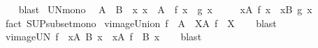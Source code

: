 \begin{isabellebody}
%
\isadelimproof
\ \ %
\endisadelimproof
%
\isatagproof
{}\isamarkupfalse%
\ blast%
\endisatagproof
{\isafoldproof}%
%
\isadelimproof
\isanewline
%
\endisadelimproof
\isanewline
{}\isamarkupfalse%
\ UN{\isacharunderscore}{\kern0pt}mono{\isacharcolon}{\kern0pt}\isanewline
\ \ {\isachardoublequoteopen}A\ {\isasymsubseteq}\ B\ {\isasymLongrightarrow}\ {\isacharparenleft}{\kern0pt}{\isasymAnd}x{\isachardot}{\kern0pt}\ x\ {\isasymin}\ A\ {\isasymLongrightarrow}\ f\ x\ {\isasymsubseteq}\ g\ x{\isacharparenright}{\kern0pt}\ {\isasymLongrightarrow}\isanewline
\ \ \ \ {\isacharparenleft}{\kern0pt}{\isasymUnion}x{\isasymin}A{\isachardot}{\kern0pt}\ f\ x{\isacharparenright}{\kern0pt}\ {\isasymsubseteq}\ {\isacharparenleft}{\kern0pt}{\isasymUnion}x{\isasymin}B{\isachardot}{\kern0pt}\ g\ x{\isacharparenright}{\kern0pt}{\isachardoublequoteclose}\isanewline
%
\isadelimproof
\ \ %
\endisadelimproof
%
\isatagproof
{}\isamarkupfalse%
\ {\isacharparenleft}{\kern0pt}fact\ SUP{\isacharunderscore}{\kern0pt}subset{\isacharunderscore}{\kern0pt}mono{\isacharparenright}{\kern0pt}%
\endisatagproof
{\isafoldproof}%
%
\isadelimproof
\isanewline
%
\endisadelimproof
\isanewline
{}\isamarkupfalse%
\ vimage{\isacharunderscore}{\kern0pt}Union{\isacharcolon}{\kern0pt}\ {\isachardoublequoteopen}f\ {\isacharminus}{\kern0pt}{\isacharbackquote}{\kern0pt}\ {\isacharparenleft}{\kern0pt}{\isasymUnion}A{\isacharparenright}{\kern0pt}\ {\isacharequal}{\kern0pt}\ {\isacharparenleft}{\kern0pt}{\isasymUnion}X{\isasymin}A{\isachardot}{\kern0pt}\ f\ {\isacharminus}{\kern0pt}{\isacharbackquote}{\kern0pt}\ X{\isacharparenright}{\kern0pt}{\isachardoublequoteclose}\isanewline
%
\isadelimproof
\ \ %
\endisadelimproof
%
\isatagproof
{}\isamarkupfalse%
\ blast%
\endisatagproof
{\isafoldproof}%
%
\isadelimproof
\isanewline
%
\endisadelimproof
\isanewline
{}\isamarkupfalse%
\ vimage{\isacharunderscore}{\kern0pt}UN{\isacharcolon}{\kern0pt}\ {\isachardoublequoteopen}f\ {\isacharminus}{\kern0pt}{\isacharbackquote}{\kern0pt}\ {\isacharparenleft}{\kern0pt}{\isasymUnion}x{\isasymin}A{\isachardot}{\kern0pt}\ B\ x{\isacharparenright}{\kern0pt}\ {\isacharequal}{\kern0pt}\ {\isacharparenleft}{\kern0pt}{\isasymUnion}x{\isasymin}A{\isachardot}{\kern0pt}\ f\ {\isacharminus}{\kern0pt}{\isacharbackquote}{\kern0pt}\ B\ x{\isacharparenright}{\kern0pt}{\isachardoublequoteclose}\isanewline
%
\isadelimproof
\ \ %
\endisadelimproof
%
\isatagproof
{}\isamarkupfalse%
\ blast%
\endisatagproof
{\isafoldproof}%
%
\isadelimproof
\isanewline

\end{isabellebody}
